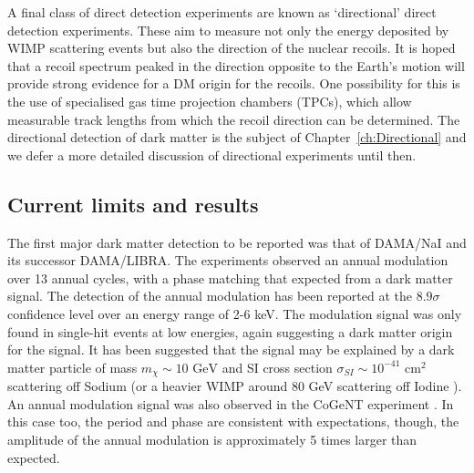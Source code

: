 A final class of direct detection experiments are known as `directional' direct detection experiments. These aim to measure not only the energy deposited by WIMP scattering events but also the direction of the nuclear recoils. It is hoped that a recoil spectrum peaked in the direction opposite to the Earth's motion will provide strong evidence for a DM origin for the recoils. One possibility for this is the use of specialised gas time projection chambers (TPCs), which allow measurable track lengths from which the recoil direction can be determined. The directional detection of dark matter is the subject of Chapter~\ref{ch:Directional} and we defer a more detailed discussion of directional experiments until then.

\subsection{Current limits and results}

The first major dark matter detection to be reported was that of DAMA/NaI \cite{Bernabei:2003} and its successor DAMA/LIBRA. The experiments observed an annual modulation over 13 annual cycles, with a phase matching that expected from a dark matter signal. The detection of the annual modulation has been reported at the $8.9\sigma$ confidence level over an energy range of 2-6 keV. The modulation signal was only found in single-hit events at low energies, again suggesting a dark matter origin for the signal. It has been suggested that the signal may be explained by a dark matter particle of mass $m_\chi \sim 10 \textrm{ GeV}$ and SI cross section $\sigma_{SI} \sim 10^{-41} \textrm{ cm}^2$ \cite{Belli:2011} scattering off Sodium (or a heavier WIMP around 80 GeV scattering off Iodine \cite{Savage:2009}). An annual modulation signal was also observed in the CoGeNT experiment \cite{Aalseth:2011b, Aalseth:2014a}. In this case too, the period and phase are consistent with expectations, though, the amplitude of the annual modulation is approximately 5 times larger than expected. 

